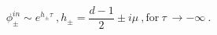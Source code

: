 \begin{equation}
\phi^{in}_{\pm}\sim e^{h_{\pm}\tau} \ ,
h_{\pm}=\frac{d-1}{2}\pm i\mu \ ,
\mathrm{for}  \  \tau \  \rightarrow -\infty  \ .
\end{equation}

